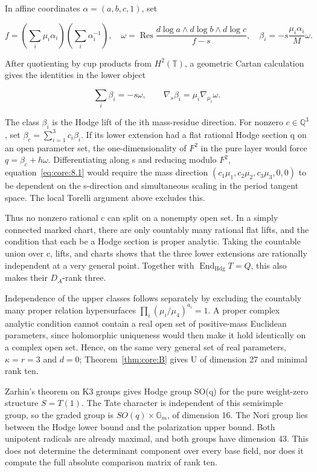 \documentclass[11pt,a4paper,oneside]{article}
\theoremstyle{plain}
\theoremstyle{definition}
\theoremstyle{remark}
\numberwithin{equation}{section}
\begin{document}
In affine coordinates \(\alpha=(a,b,c,1)\), set

\begin{equation}
f=(\textstyle\sum_i\mu_i\alpha_i)(\sum_i\alpha_i^{-1}),
 \quad\omega=\operatorname{Res}\frac{d\log a\wedge d\log b\wedge d\log c}{f-s},
 \quad\beta_i=-s\frac{\mu_i\alpha_i}{M}\omega.
\end{equation}

After quotienting by cup products from \(H^2(\mathbb T)\), a geometric Cartan calculation gives the identities in the lower object

\begin{equation}
\sum_i\beta_i=-s\omega,\qquad
             \nabla_s\beta_i=\mu_i\nabla_{\mu_i}\omega. \label{eq:core:8.1}
\end{equation}

The class \(\beta _i\) is the Hodge lift of the ith mass-residue direction. For nonzero \(c\in\mathbb Q^3\), set \(\beta_c=\sum_{i=1}^3c_i\beta_i\). If its lower extension had a flat rational Hodge section q on an open parameter set, the one-dimensionality of \(F^2\) in the pure layer would force \(q=\beta _c+h\omega \). Differentiating along s and reducing modulo \(F^2\), equation~\eqref{eq:core:8.1} would require the mass direction \((c_1\mu_1,c_2\mu_2,c_3\mu_3,0,0)\) to be dependent on the s-direction and simultaneous scaling in the period tangent space. The local Torelli argument above excludes this.

Thus no nonzero rational c can split on a nonempty open set. In a simply connected marked chart, there are only countably many rational flat lifts, and the condition that each be a Hodge section is proper analytic. Taking the countable union over c, lifts, and charts shows that the three lower extensions are rationally independent at a very general point. Together with \(\operatorname{End}_{\mathrm{Hdg}} T=Q\), this also makes their \(D_A\)-rank three.

Independence of the upper classes follows separately by excluding the countably many proper relation hypersurfaces \(\prod_i(\mu_i/\mu_4)^{a_i}=1\). A proper complex analytic condition cannot contain a real open set of positive-mass Euclidean parameters, since holomorphic uniqueness would then make it hold identically on a complex open set. Hence, on the same very general set of real parameters, \(\kappa =r=3\) and \(d=0\); Theorem~\ref{thm:core:B} gives U of dimension 27 and minimal rank ten.

Zarhin's theorem on K3 groups \cite{zarhin} gives Hodge group SO(q) for the pure weight-zero structure \(S=T(1)\). The Tate character is independent of this semisimple group, so the graded group is \(SO(q)\times \mathbb G_m\), of dimension 16. The Nori group lies between the Hodge lower bound and the polarization upper bound. Both unipotent radicals are already maximal, and both groups have dimension 43. This does not determine the determinant component over every base field, nor does it compute the full absolute comparison matrix of rank ten.
\end{document}
